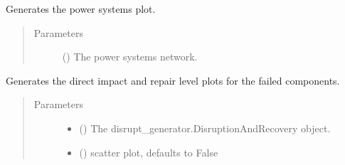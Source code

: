 \documentclass[letterpaper,10pt,english]{sphinxmanual}
\begin{document}

\begin{fulllineitems}
\label{\detokenize{apidoc:dreaminsg_integrated_model.src.plots.plot_power_net}}
\sphinxAtStartPar
Generates the power systems plot.
\begin{quote}\begin{description}
\item[{Parameters}] \leavevmode
\sphinxAtStartPar
{} () \textendash{} The power systems network.

\end{description}\end{quote}

\end{fulllineitems}


\begin{fulllineitems}
\label{\detokenize{apidoc:dreaminsg_integrated_model.src.plots.plot_repair_curves}}
\sphinxAtStartPar
Generates the direct impact and repair level plots for the failed components.
\begin{quote}\begin{description}
\item[{Parameters}] \leavevmode\begin{itemize}
\item {} 
\sphinxAtStartPar
{} () \textendash{} The disrupt\_generator.DisruptionAndRecovery object.

\item {} 
\sphinxAtStartPar
{} (\sphinxstyleliteralemphasis{\sphinxupquote{, }}) \textendash{} scatter plot, defaults to False

\end{itemize}

\end{description}\end{quote}

\end{fulllineitems}
\end{document}
